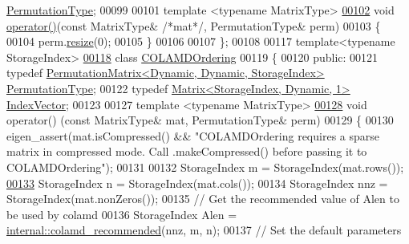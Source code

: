 \begin{DoxyCode}
       \hyperlink{group___core___module}{PermutationType};
00099     
00101     \textcolor{keyword}{template} <\textcolor{keyword}{typename} MatrixType>
\hyperlink{group___ordering_methods___module_aa39e772105ed66da9e909f2a9385be37}{00102}     \textcolor{keywordtype}{void} \hyperlink{group___ordering_methods___module_aa39e772105ed66da9e909f2a9385be37}{operator()}(\textcolor{keyword}{const} MatrixType& \textcolor{comment}{/*mat*/}, PermutationType& perm)
00103     \{
00104       perm.\hyperlink{group___core___module_a0e0fda6e84d69e02432e4770359bb532}{resize}(0); 
00105     \}
00106     
00107 \};
00108 
00117 \textcolor{keyword}{template}<\textcolor{keyword}{typename} StorageIndex>
\hyperlink{group___ordering_methods___module}{00118} \textcolor{keyword}{class }\hyperlink{group___ordering_methods___module_class_eigen_1_1_c_o_l_a_m_d_ordering}{COLAMDOrdering}
00119 \{
00120   \textcolor{keyword}{public}:
00121     \textcolor{keyword}{typedef} \hyperlink{group___core___module}{PermutationMatrix<Dynamic, Dynamic, StorageIndex>}
       \hyperlink{group___core___module}{PermutationType}; 
00122     \textcolor{keyword}{typedef} \hyperlink{group___core___module}{Matrix<StorageIndex, Dynamic, 1>} 
      \hyperlink{group___core___module}{IndexVector};
00123     
00127     \textcolor{keyword}{template} <\textcolor{keyword}{typename} MatrixType>
\hyperlink{group___ordering_methods___module_a708cb20191dcd79856d922f262405946}{00128}     \textcolor{keywordtype}{void} operator() (\textcolor{keyword}{const} MatrixType& mat, PermutationType& perm)
00129     \{
00130       eigen\_assert(mat.isCompressed() && \textcolor{stringliteral}{"COLAMDOrdering requires a sparse matrix in compressed mode. Call
       .makeCompressed() before passing it to COLAMDOrdering"});
00131       
00132       StorageIndex m = StorageIndex(mat.rows());
\hyperlink{struct_eigen_1_1internal_1_1colamd__col}{00133}       StorageIndex n = StorageIndex(mat.cols());
00134       StorageIndex nnz = StorageIndex(mat.nonZeros());
00135       \textcolor{comment}{// Get the recommended value of Alen to be used by colamd}
00136       StorageIndex Alen = \hyperlink{namespace_eigen_1_1internal_a182742cb4291838dfc4cd1e5b2b95c65}{internal::colamd\_recommended}(nnz, m, n); 
00137       \textcolor{comment}{// Set the default parameters}

\end{DoxyCode}
